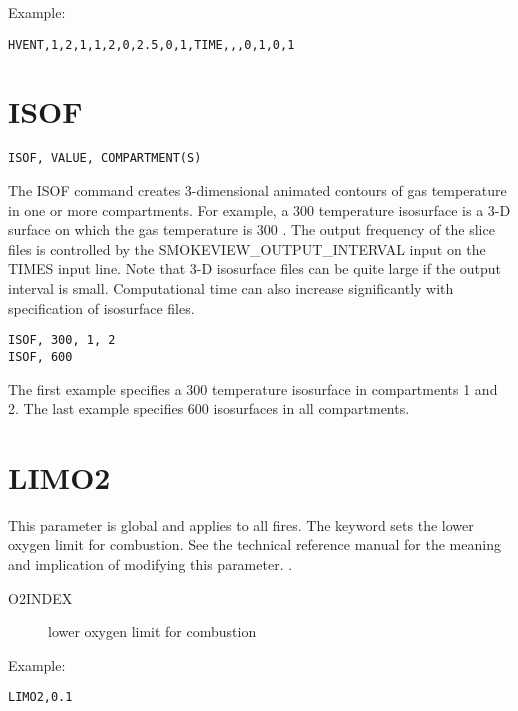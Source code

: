 Example:

\begin{lstlisting}
HVENT,1,2,1,1,2,0,2.5,0,1,TIME,,,0,1,0,1
\end{lstlisting}

\section{ISOF}

\begin{lstlisting}
ISOF, VALUE, COMPARTMENT(S)
\end{lstlisting}

The ISOF command creates 3-dimensional animated contours of gas temperature in one or more compartments.  For example, a 300 \degc temperature isosurface is a 3-D surface on which the gas temperature is 300 \degc. The output frequency of the slice files is controlled by the SMOKEVIEW\_OUTPUT\_INTERVAL input on the TIMES input line. Note that 3-D isosurface files can be quite large if the output interval is small. Computational time can also increase significantly with specification of isosurface files.

\begin{lstlisting}
ISOF, 300, 1, 2
ISOF, 600
\end{lstlisting}

The first example specifies a 300 \degc temperature isosurface in compartments 1 and 2.  The last example specifies 600 \degc isosurfaces in all compartments.

\section{LIMO2}

This parameter is global and applies to all fires. The keyword sets the lower oxygen limit for combustion. See the technical reference manual for the meaning and implication of modifying this parameter. \cite{CFAST_Tech_Guide_7}.

\begin{adjustwidth}{1cm}{0cm}
\begin{description}
  \item[O2INDEX] lower oxygen limit for combustion
\end{description}
\end{adjustwidth}

\noindent Example:

\begin{lstlisting}
LIMO2,0.1
\end{lstlisting}

